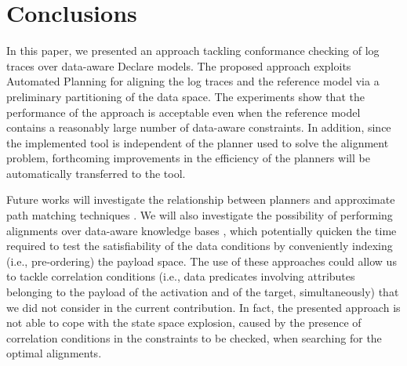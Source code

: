 \section{Conclusions}\label{sec:end}
In this paper, we presented an approach tackling conformance checking of log traces over data-aware Declare models. The proposed approach exploits Automated Planning for aligning the log traces and the reference model via a preliminary partitioning of the data space. The experiments show that the performance of the approach is acceptable even when the reference model contains a reasonably large number of data-aware constraints. In addition, since the implemented tool is independent of the planner used to solve the alignment problem, forthcoming improvements in the efficiency of the planners will be automatically transferred to the tool.
%


Future works will investigate the relationship between planners and approximate path matching techniques \cite{Myers1989}. We will also investigate the possibility of performing alignments over data-aware knowledge bases \cite{10.1007/978-3-319-39696-5_18}, which potentially quicken the time required to test the satisfiability of the data conditions by conveniently indexing (i.e., pre-ordering) the payload space. {The use of these approaches could allow us to tackle correlation conditions  (i.e., data predicates involving attributes belonging to the payload of the activation and of the target, simultaneously) \cite{BurattinMS16} that we did not consider in the current contribution. In fact, the presented approach is not able to cope with the state space explosion, caused by the presence of correlation conditions in the constraints to be checked, when searching for the optimal alignments.}
